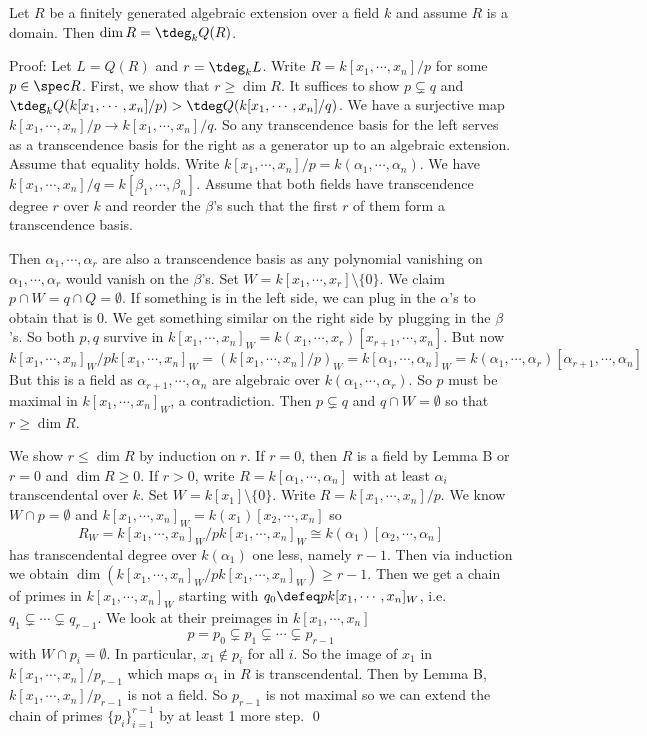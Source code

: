 \begin{thmm}
Let $R$ be a finitely generated algebraic extension over a field $k$ and assume $R$ is a domain. Then $\dim R=\tdeg_k Q(R)$.
\end{thmm}

\noindent Proof: Let $L=Q(R)$ and $r=\tdeg_k L$. Write $R=k[x_1,\cdots,x_n]/p$ for some $p \in \spec R$. First, we show that $r \geq \dim R$. It suffices to show $p \subsetneq q$ and $\tdeg_k Q(k[x_1,\cdots,x_n]/p) > \tdeg Q(k[x_1,\cdots,x_n]/q)$. We have a surjective map $k[x_1,\cdots,x_n]/p \to k[x_1,\cdots,x_n]/q$. So any transcendence basis for the left serves as a transcendence basis for the right as a generator up to an algebraic extension. Assume that equality holds. Write $k[x_1,\cdots,x_n]/p =k(\alpha_1,\cdots,\alpha_n)$. We have $k[x_1,\cdots,x_n]/q=k[\beta_1,\cdots,\beta_n]$. Assume that both fields have transcendence degree $r$ over $k$ and reorder the $\beta$'s such that the first $r$ of them form a transcendence basis. 

Then $\alpha_1,\cdots,\alpha_r$ are also a transcendence basis as any polynomial vanishing on $\alpha_1,\cdots,\alpha_r$ would vanish on the $\beta$'s. Set $W=k[x_1,\cdots,x_r] \setminus \{0\}$. We claim $p \cap W=q \cap Q=\emptyset$. If something is in the left side, we can plug in the $\alpha$'s to obtain that is 0. We get something similar on the right side by plugging in the $\beta$'s. So both $p,q$ survive in $k[x_1,\cdots,x_n]_W=k(x_1,\cdots,x_r)[x_{r+1},\cdots,x_n]$. But now 
\[
k[x_1,\cdots,x_n]_W/pk[x_1,\cdots,x_n]_W=(k[x_1,\cdots,x_n]/p)_W=k[\alpha_1,\cdots,\alpha_n]_W=k(\alpha_1,\cdots,\alpha_r)[\alpha_{r+1},\cdots,\alpha_n]
\]
But this is a field as $\alpha_{r+1},\cdots,\alpha_n$ are algebraic over $k(\alpha_1,\cdots,\alpha_r)$. So $p$ must be maximal in $k[x_1,\cdots,x_n]_W$, a contradiction. Then $p \subsetneq q$ and $q \cap W =\emptyset$ so that $r \geq \dim R$. 

We show $r \leq \dim R$ by induction on $r$. If $r=0$, then $R$ is a field by Lemma B or $r=0$ and $\dim R \geq 0$. If $r>0$, write $R=k[\alpha_1,\cdots,\alpha_n]$ with at least $\alpha_i$ transcendental over $k$. Set $W=k[x_1]\setminus \{0\}$. Write $R=k[x_1,\cdots,x_n]/p$. We know $W \cap p=\emptyset$ and $k[x_1,\cdots,x_n]_W=k(x_1)[x_2,\cdots,x_n]$ so 
\[
R_W=k[x_1,\cdots,x_n]_W/pk[x_1,\cdots,x_n]_W \cong k(\alpha_1)[\alpha_2,\cdots,\alpha_n] 
\]
has transcendental degree over $k(\alpha_1)$ one less, namely $r-1$. Then via induction we obtain $\dim(k[x_1,\cdots,x_n]_W/pk[x_1,\cdots,x_n]_W) \geq r-1$. Then we get a chain of primes in $k[x_1,\cdots,x_n]_W$ starting with $q_0 \defeq pk[x_1,\cdots,x_n]_W$, i.e. $q_1 \subsetneq \cdots \subsetneq q_{r-1}$. We look at their preimages in $k[x_1,\cdots,x_n]$
\[
p=p_0 \subsetneq p_1 \subsetneq \cdots \subsetneq p_{r-1}
\]
with $W \cap p_i = \emptyset$. In particular, $x_1 \notin p_i$ for all $i$. So the image of $x_1$ in $k[x_1,\cdots,x_n]/p_{r-1}$ which maps $\alpha_1$ in $R$ is transcendental. Then by Lemma B, $k[x_1,\cdots,x_n]/p_{r-1}$ is not a field. So $p_{r-1}$ is not maximal so we can extend the chain of primes $\{p_i\}_{i=1}^{r-1}$ by at least 1 more step. \qed \\

